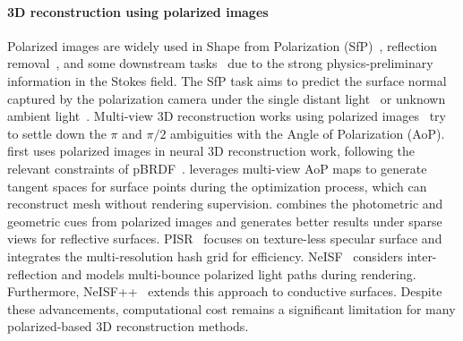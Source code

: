\paragraph{\textbf{3D reconstruction using polarized images}\quad}
Polarized images are widely used in Shape from Polarization (SfP)~\citep{miyazaki2003polarization, baek2018simultaneous, smith2018height, deschaintre2021deep, lei2022shape, ba2020deep, lyu2023shape,li2024deep, yang2024gnerp, lyu2024sfpuel}, reflection removal~\citep{li2020reflection,lyu2022physics,wang2025polarized}, and some downstream tasks~\citep{zhou2023polarization, li2023polarized} due to the strong physics-preliminary information in the Stokes field. The SfP task aims to predict the surface normal captured by the polarization camera under the single distant light~\citep{lyu2023shape, smith2018height} or unknown ambient light~\citep{ba2020deep,lei2022shape}. Multi-view 3D reconstruction works using polarized images~\citep{zhao2022polarimetric} try to settle down the $\pi$ and $\pi/2$ ambiguities with the Angle of Polarization (AoP). \pandora first uses polarized images in neural 3D reconstruction work, following the relevant constraints of pBRDF~\citep{baek2018simultaneous}. \mvas leverages multi-view AoP maps to generate tangent spaces for surface points during the optimization process, which can 
reconstruct mesh without rendering supervision. \nersp combines the photometric and geometric cues from polarized images and generates better results under sparse views for reflective surfaces. 
PISR~\citep{chen2024pisr} focuses on texture-less specular surface 
and integrates the multi-resolution hash grid for efficiency.
NeISF~\citep{li2024neisf} considers inter-reflection and models multi-bounce polarized light paths during rendering. Furthermore, NeISF++~\citep{li2025neisf++} extends this approach to conductive surfaces. 
Despite these advancements, computational cost remains a significant limitation for many polarized-based 3D reconstruction methods.

